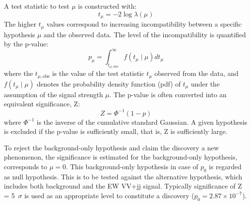 A test statistic to test $\mu$ is constructed with:
\begin{equation}
t_{\mu}= -2 \log \lambda (\mu)
\end{equation}
The higher $t_{\mu}$ values correspond to increasing incompatibility between a specific hypothesis $\mu$ and the observed data.
The level of the incompatibility is quantified by the p-value:
\begin{equation}
p_{\mu}=\int_{t_{\mu, \mathrm{obs}}}^{\infty} f\left(t_{\mu} \mid \mu\right) d t_{\mu}
\end{equation}
where the $t_{\mu, \mathrm{obs}}$ is the value of the test statistic $t_{\mu}$ observed from the data, and $f\left(t_{\mu} \mid \mu\right)$ denotes the probability density function (pdf) of $t_{\mu}$ under the assumption of the signal strength $\mu$.
%
The p-value is often converted into an equivalent significance, Z:
\begin{equation}
Z=\Phi^{-1}(1-p)
\end{equation}
where $\Phi^{-1}$ is the inverse of the cumulative standard Gaussian.
A given hypothesis is excluded if the p-value is sufficiently small, that is, Z is sufficiently large.

To reject the background-only hypothesis and claim the discovery a new phenomenon, the significance is estimated for the background-only hypothesis, corresponds to $\mu = 0$.
This background-only hypothesis in case of $p_0$ is regarded as null hypothesis. 
This is to be tested against the alternative hypothesis, which includes both background and the EW VV+jj signal.
Typically significance of Z = 5~$\sigma$ is used as an appropriate level to constitute a discovery ($p_0 = 2.87 \times 10^{-7}$). 



